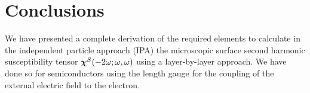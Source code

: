 \documentclass[floatfix,prb,aps,superscriptaddress,11pt,preprint,letterpaper]{revtex4}
\begin{document}
\section{Conclusions}\label{con}

We have presented a complete derivation of the required elements to
calculate in the independent particle approach (IPA) the microscopic  
surface second harmonic susceptibility tensor $\boldsymbol{\chi}^S(-2\omega;\omega,\omega)$ 
using a layer-by-layer approach. We have done so for semiconductors using 
the length gauge for the coupling of the external electric field to the 
electron. 

\appendix

%
%
%

%

%

\end{document}
